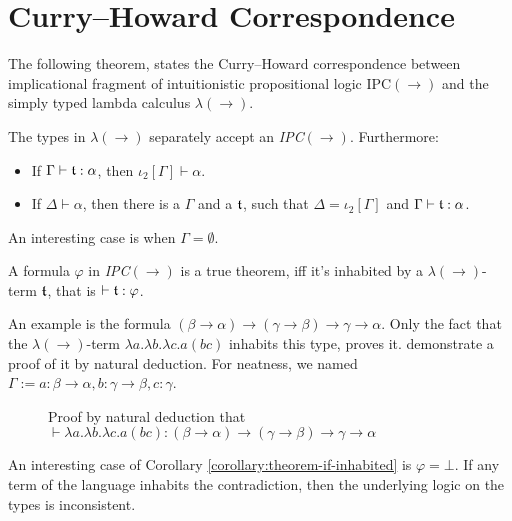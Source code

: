 \section{Curry--Howard Correspondence}

The following theorem, states the Curry--Howard correspondence between implicational fragment of intuitionistic propositional logic IPC$(\rightarrow)$ and the simply typed lambda calculus $\lambda(\rightarrow)$.

\begin{theorem}
The types in $\lambda(\rightarrow)$ separately accept an \emph{IPC}$(\rightarrow)$. Furthermore:
\begin{itemize}
    \item If $\Gamma \vdash \mathfrak{t} : \alpha$, then $\iota_2[\Gamma] \vdash \alpha$.
    \item If $\Delta \vdash \alpha$, then there is a $\Gamma$ and a $\mathfrak{t}$, such that $\Delta = \iota_2[\Gamma]$ and $\Gamma \vdash \mathfrak{t} : \alpha$.
\end{itemize}
\end{theorem}

An interesting case is when $\Gamma = \emptyset$.

\begin{corollary}
\label{corollary:theorem-if-inhabited}
A formula $\varphi$ in \emph{IPC}$(\rightarrow)$ is a true theorem, iff it's inhabited by a $\lambda(\rightarrow)$-term $\mathfrak{t}$, that is $\vdash \mathfrak{t} : \varphi$.
\end{corollary}

An example is the formula $(\beta \rightarrow \alpha) \rightarrow (\gamma \rightarrow \beta) \rightarrow \gamma \rightarrow \alpha$. Only the fact that the $\lambda(\rightarrow)$-term $\lambda a. \lambda b. \lambda c. a (b c)$ inhabits this type, proves it.  demonstrate a proof of it by natural deduction. For neatness, we named $\Gamma := a : \beta \rightarrow \alpha, b : \gamma \rightarrow \beta, c : \gamma$.

\begin{figure}
    \centering
    
    \caption{Proof by natural deduction that $\vdash \lambda a. \lambda b. \lambda c. a (b c) : (\beta \rightarrow \alpha) \rightarrow (\gamma \rightarrow \beta) \rightarrow \gamma \rightarrow \alpha$}
    \label{fig:curry-howard-example}
\end{figure}

An interesting case of Corollary \ref{corollary:theorem-if-inhabited} is $\varphi = \bot$. If any term of the language inhabits the contradiction, then the underlying logic on the types is inconsistent.
